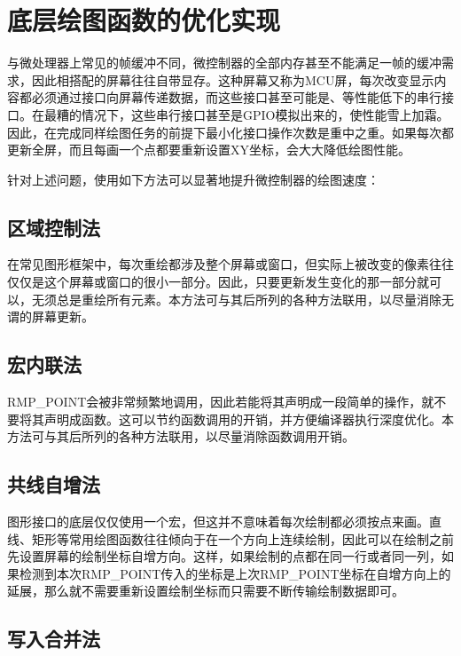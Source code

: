 \section{底层绘图函数的优化实现}\label{sec:optimised-implementation-of-low-level-drawing}

与微处理器上常见的帧缓冲不同，微控制器的全部内存甚至不能满足一帧的缓冲需求，因此相搭配的屏幕往往自带显存。这种屏幕又称为MCU屏，每次改变显示内容都必须通过接口向屏幕传递数据，而这些接口甚至可能是、等性能低下的串行接口。在最糟的情况下，这些串行接口甚至是GPIO模拟出来的，使性能雪上加霜。因此，在完成同样绘图任务的前提下最小化接口操作次数是重中之重。如果每次都更新全屏，而且每画一个点都要重新设置XY坐标，会大大降低绘图性能。

针对上述问题，使用如下方法可以显著地提升微控制器的绘图速度：

\subsection{区域控制法}\label{subsec:region-control}

在常见图形框架中，每次重绘都涉及整个屏幕或窗口，但实际上被改变的像素往往仅仅是这个屏幕或窗口的很小一部分。因此，只要更新发生变化的那一部分就可以，无须总是重绘所有元素。本方法可与其后所列的各种方法联用，以尽量消除无谓的屏幕更新。

\subsection{宏内联法}\label{subsec:macro-inlining}

RMP\_POINT会被非常频繁地调用，因此若能将其声明成一段简单的操作，就不要将其声明成函数。这可以节约函数调用的开销，并方便编译器执行深度优化。本方法可与其后所列的各种方法联用，以尽量消除函数调用开销。

\subsection{共线自增法}\label{subsec:collinear-auto-increment}

图形接口的底层仅仅使用一个宏，但这并不意味着每次绘制都必须按点来画。直线、矩形等常用绘图函数往往倾向于在一个方向上连续绘制，因此可以在绘制之前先设置屏幕的绘制坐标自增方向。这样，如果绘制的点都在同一行或者同一列，如果检测到本次RMP\_POINT传入的坐标是上次RMP\_POINT坐标在自增方向上的延展，那么就不需要重新设置绘制坐标而只需要不断传输绘制数据即可。

\subsection{写入合并法}\label{subsec:write-combining}

